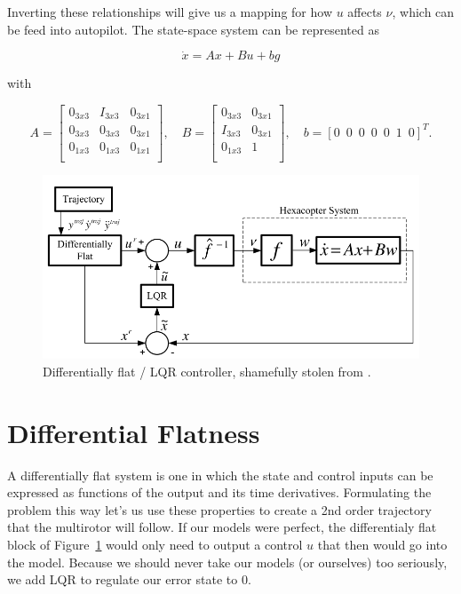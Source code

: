 \documentclass[12pt]{article}
\begin{document}
\noindent Inverting these relationships will give us a mapping for how $u$ affects $\nu$, which can be feed into autopilot. The state-space system can be represented as

\begin{equation}
\dot{x} = Ax + Bu + bg
\end{equation}

\noindent with


\begin{equation}
A =
\begin{bmatrix}
0_{3x3} & I_{3x3} & 0_{3x1} \\
0_{3x3} & 0_{3x3} & 0_{3x1} \\
0_{1x3} & 0_{1x3} & 0_{1x1} \\
\end{bmatrix}
, \quad
B =
\begin{bmatrix}
0_{3x3} & 0_{3x1} \\
I_{3x3} & 0_{3x1} \\
0_{1x3} & 1 \\
\end{bmatrix}
, \quad
b = [0 \enspace 0 \enspace 0 \enspace 0 \enspace 0 \enspace 1 \enspace 0]^T.
\end{equation}

\begin{figure}[H]
	\centering
	\includegraphics[scale=0.50]{diff_flat}
	\caption{Differentially flat / LQR controller, shamefully stolen from \cite{Ferrin2011}.}
	\label{fig:diff_flat_arch}
\end{figure}

\section{Differential Flatness}

A differentially flat system is one in which the state and control inputs can be expressed as functions of the output and its time derivatives. Formulating the problem this way let's us use these properties to create a 2nd order trajectory that the multirotor will follow. If our models were perfect, the differentialy flat block of Figure~\ref{fig:diff_flat_arch} would only need to output a control $u$ that then would go into the model. Because we should never take our models (or ourselves) too seriously, we add LQR to regulate our error state to 0.
\end{document}
